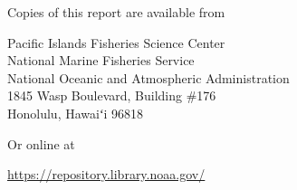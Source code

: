 {\fontsize{14pt}{16pt}\selectfont Copies of this report are available from\par}
\vspace{0.25cm}

{\fontsize{12pt}{14pt}\selectfont
Pacific Islands Fisheries Science Center\\
National Marine Fisheries Service\\
National Oceanic and Atmospheric Administration\\
1845 Wasp Boulevard, Building \#176\\
Honolulu, Hawaiʻi 96818\par}
\vspace{0.5cm}



{\fontsize{14pt}{16pt}\selectfont Or online at\par}
\vspace{0.25cm}

{\fontsize{12pt}{14pt}\selectfont \href{https://repository.library.noaa.gov/}{\color{blue}\underline{https://repository.library.noaa.gov/}}\par}


\clearpage
{}   %
